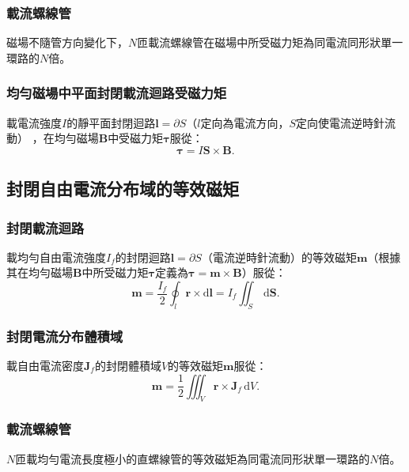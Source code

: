 \documentclass[a4paper,12pt]{report}
\begin{document}
\begin{itemize}
\subsubsection{載流螺線管}
磁場不隨管方向變化下，$N$匝載流螺線管在磁場中所受磁力矩為同電流同形狀單一環路的$N$倍。
\subsubsection{均勻磁場中平面封閉載流迴路受磁力矩}
載電流強度$I$的靜平面封閉迴路$\mathbf{l}=\partial S$（$l$定向為電流方向，$S$定向使電流逆時針流動）  ，在均勻磁場$\mathbf{B}$中受磁力矩$\boldsymbol{\tau}$服從：
\[\boldsymbol{\tau}=I\mathbf{S}\times\mathbf{B}.\]
\subsection{封閉自由電流分布域的等效磁矩}
\subsubsection{封閉載流迴路}
載均勻自由電流強度$I_f$的封閉迴路$\mathbf{l}=\partial S$（電流逆時針流動）的等效磁矩$\mathbf{m}$（根據其在均勻磁場$\mathbf{B}$中所受磁力矩$\boldsymbol{\tau}$定義為$\boldsymbol{\tau}=\mathbf{m}\times\mathbf{B}$）服從：
\[\mathbf{m}=\frac{I_f}{2}\oint_l\mathbf{r}\times\mathrm{d}\mathbf{l}=I_f\iint_S\,\mathrm{d}\mathbf{S}.\]
\subsubsection{封閉電流分布體積域}
載自由電流密度$\mathbf{J}_f$的封閉體積域$V$的等效磁矩$\mathbf{m}$服從：
\[\mathbf{m}=\frac{1}{2}\iiint_V\mathbf{r}\times\mathbf{J}_f\,\mathrm{d}V.\]
\subsubsection{載流螺線管}
$N$匝載均勻電流長度極小的直螺線管的等效磁矩為同電流同形狀單一環路的$N$倍。

\end{itemize}
\end{document}
